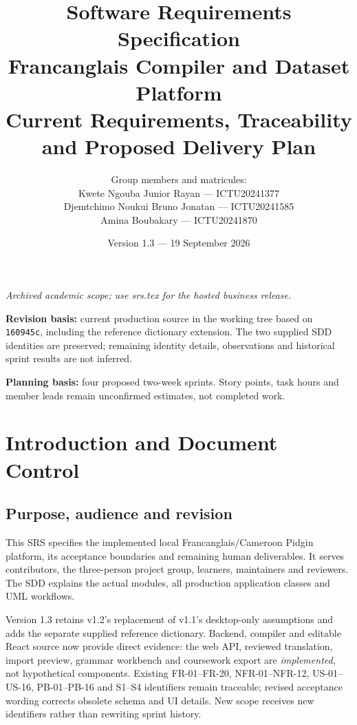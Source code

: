 \documentclass[11pt,a4paper]{article}
\title{\textbf{Software Requirements Specification}\\[0.4em]
\Large Francanglais Compiler and Dataset Platform\\[0.6em]
\large Current Requirements, Traceability and Proposed Delivery Plan}
\author{Group members and matricules:\\[0.5em]
Kwete Ngouba Junior Rayan --- ICTU20241377\\[0.5em]
Djemtchimo Noukui Bruno Jonatan --- ICTU20241585\\[0.5em]
Amina Boubakary --- ICTU20241870}
\date{Version 1.3 --- 19 September 2026}
\begin{document}
\maketitle\thispagestyle{empty}
\begin{center}
\textit{Archived academic scope; use srs.tex for the hosted business release.}
\end{center}
\vfill
\noindent\textbf{Revision basis:} current production source in the working tree
based on \nolinkurl{160945c}, including the reference dictionary extension.
The two supplied SDD identities are preserved; remaining identity details,
observations and historical sprint results are not inferred.
\par\medskip
\noindent\textbf{Planning basis:} four proposed two-week sprints. Story points,
task hours and member leads remain unconfirmed estimates, not completed work.
\newpage\tableofcontents\newpage

\section{Introduction and Document Control}
\subsection{Purpose, audience and revision}
This SRS specifies the implemented local Francanglais/Cameroon Pidgin platform,
its acceptance boundaries and remaining human deliverables. It serves contributors,
the three-person project group, learners, maintainers and reviewers. The SDD
explains the actual modules, all production application classes and UML workflows.

Version 1.3 retains v1.2's replacement of v1.1's desktop-only assumptions and
adds the separate supplied reference dictionary. Backend, compiler and
editable React source now provide direct evidence: the web API, reviewed
translation, import preview, grammar workbench and coursework export are
\emph{implemented}, not hypothetical components. Existing FR-01--FR-20,
NFR-01--NFR-12, US-01--US-16, PB-01--PB-16 and S1--S4 identifiers remain
traceable; revised acceptance wording corrects obsolete schema and UI details.
New scope receives new identifiers rather than rewriting sprint history.
\end{document}
